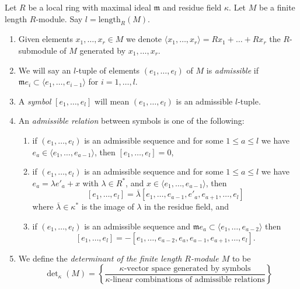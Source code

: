 \begin{definition}
\label{definition-determinant}
Let $R$ be a local ring with maximal ideal $\mathfrak m$ and
residue field $\kappa$. Let $M$ be a finite length $R$-module.
Say $l = \text{length}_R(M)$.
\begin{enumerate}
\item Given elements $x_1, \ldots, x_r \in M$ we denote
$\langle x_1, \ldots, x_r \rangle = Rx_1 + \ldots + Rx_r$ the
$R$-submodule of $M$ generated by $x_1, \ldots, x_r$.
\item We will say an $l$-tuple of elements
$(e_1, \ldots, e_l)$ of $M$ is {\it admissible} if
$\mathfrak m e_i \subset \langle e_1, \ldots, e_{i - 1} \rangle$
for $i = 1, \ldots, l$.
\item A {\it symbol} $[e_1, \ldots, e_l]$ will mean
$(e_1, \ldots, e_l)$ is an admissible $l$-tuple.
\item An {\it admissible relation} between symbols is one of the following:
\begin{enumerate}
\item if $(e_1, \ldots, e_l)$ is an admissible sequence and
for some $1 \leq a \leq l$ we have
$e_a \in \langle e_1, \ldots, e_{a - 1}\rangle$, then
$[e_1, \ldots, e_l] = 0$,
\item if $(e_1, \ldots, e_l)$ is an admissible sequence and
for some $1 \leq a \leq l$ we have $e_a = \lambda e'_a + x$
with $\lambda \in R^*$, and
$x \in \langle e_1, \ldots, e_{a - 1}\rangle$, then
$$
[e_1, \ldots, e_l] =
\overline{\lambda} [e_1, \ldots, e_{a - 1}, e'_a, e_{a + 1}, \ldots, e_l]
$$
where $\overline{\lambda} \in \kappa^*$ is the image of $\lambda$ in
the residue field, and
\item if $(e_1, \ldots, e_l)$ is an admissible sequence and
$\mathfrak m e_a \subset \langle e_1, \ldots, e_{a - 2}\rangle$ then
$$
[e_1, \ldots, e_l] =
- [e_1, \ldots, e_{a - 2}, e_a, e_{a - 1}, e_{a + 1}, \ldots, e_l].
$$
\end{enumerate}
\item
We define the {\it determinant of the finite length $R$-module $M$} to be
$$
\det\nolimits_\kappa(M) =
\left\{
\frac{\kappa\text{-vector space generated by symbols}}
{\kappa\text{-linear combinations of admissible relations}}
\right\}
$$
\end{enumerate}
\end{definition}